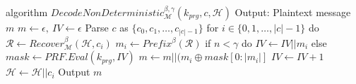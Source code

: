 \begin{Pseudocode}[float, caption={
Meteor DecodeNonDeterministic Algorithm.
This algorithm differs from the original Decode algorithm by interpreting the first $\gamma$ bits of the hiddentext as IV.
After decoding $\gamma$ bits of hiddentext, a PRF is initialized with IV for generation of pseudorandom masks.}, label={alg:decode-nd}]
algorithm $DecodeNonDeterministic_{\mathcal{M}}^{\beta,\gamma}(k_{prg}, c, \mathcal{H})$
	Output: Plaintext message $m$
	$m \leftarrow \epsilon,~ IV \leftarrow \epsilon$
	Parse $c$ as $\{ c_0, c_1, \dots, c_{|c|-1} \}$
	for $i \in \{0, 1, \dots, |c|-1 \}$ do
		$\mathcal{R} \leftarrow Recover_{\mathcal{M}}^\beta(\mathcal{H}, c_i)$
		$m_i \leftarrow Prefix^\beta(\mathcal{R})$
		if $n < \gamma$ do
			$IV \leftarrow IV || m_i$
		else
			$mask \leftarrow PRF.Eval(k_{prg}, IV)$
			$m \leftarrow m || (m_i \oplus mask[0: |m_i|]$
			$IV \leftarrow IV + 1$
		$\mathcal{H} \leftarrow \mathcal{H}||c_i$
	Output $m$
\end{Pseudocode}


